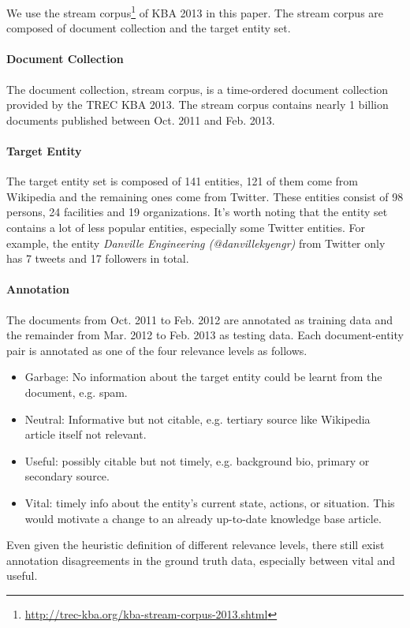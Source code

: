 \documentclass{sig-alternate}
\begin{document}
We use the stream corpus\footnote{\url{http://trec-kba.org/kba-stream-corpus-2013.shtml}} of KBA 2013 in this paper. The stream corpus are composed of document collection and the target entity set.
\paragraph{Document Collection}
The document collection, stream corpus, is a time-ordered document collection provided by the TREC KBA 2013. The stream corpus contains nearly 1 billion documents published between Oct. 2011 and Feb. 2013. 

\paragraph{Target Entity}
The target entity set is composed of 141 entities, 121 of them come from Wikipedia and the remaining ones come from Twitter. These entities consist of 98 persons, 24 facilities and 19 organizations. It's worth noting that the entity set contains a lot of less popular entities, especially some Twitter entities. For example, the entity \textit{Danville Engineering (@danvillekyengr)} from Twitter only has 7 tweets and 17 followers in total.

\paragraph{Annotation}
The documents from Oct. 2011 to Feb. 2012 are annotated as training data and the remainder from Mar. 2012 to Feb. 2013 as testing data. Each document-entity pair is annotated as one of the four relevance levels as follows.
\begin{itemize}
\item Garbage: No information about the target entity could be learnt from the document, e.g. spam.
\item Neutral: Informative but not citable, e.g. tertiary source like Wikipedia article itself not relevant.
\item Useful: possibly citable but not timely, e.g. background bio, primary or secondary source.
\item Vital: timely info about the entity's current state, actions, or situation. This would motivate a change to an already up-to-date knowledge base article.
\end{itemize}
Even given the heuristic definition of different relevance levels, there still exist annotation disagreements in the ground truth data, especially between vital and useful.
\end{document}
